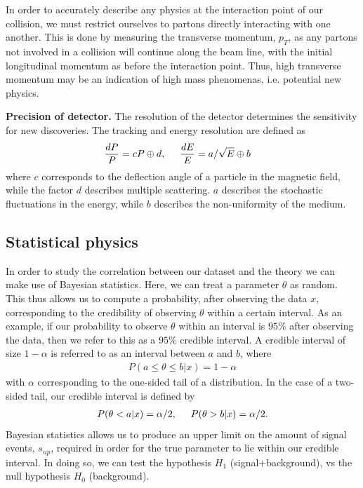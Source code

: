 \documentclass[12pt,a4paper]{amsart}
\begin{document}
In order to accurately describe any physics at the interaction point of our collision, we must restrict ourselves to partons directly interacting with one another. This is done by measuring the transverse momentum, $p_T$, as any partons not involved in a collision will continue along the beam line, with the initial longitudinal momentum as before the interaction point. Thus, high transverse momentum may be an indication of high mass phenomenas, i.e. potential new physics.


\textbf{Precision of detector.} The resolution of the detector determines the sensitivity for new discoveries. The tracking and energy resolution are defined as 
\begin{align}
\frac{dP}{P} = cP\oplus d, \hspace{.5cm}\frac{dE}{E}&= a/\sqrt{E}\oplus b \label{eq:resolution}
\end{align}
where $c$ corresponds to the deflection angle of a particle in the magnetic field, while the factor $d$ describes multiple scattering. $a$ describes the stochastic fluctuations in the energy, while $b$ describes the non-uniformity of the medium.

\subsection{Statistical physics}
In order to study the correlation between our dataset and the theory we can make use of Bayesian statistics. Here, we can treat a parameter $\theta$ as random. This thus allows us to compute a probability, after observing the data $x$, corresponding to the credibility of observing $\theta$ within a certain interval. As an example, if our probability to observe $\theta$ within an interval is $95\%$ after observing the data, then we refer to this as a $95\%$ credible interval. A credible interval of size $1-\alpha$ is referred to as an interval between $a$ and $b$, where
\begin{align}
P(a\leq \theta \leq b|x) = 1-\alpha	\label{eq:credible_interval_one_sided}
\end{align}
with $\alpha$ corresponding to the one-sided tail of a distribution. In the case of a two-sided tail, our credible interval is defined by
\begin{align}
P(\theta<a|x) = \alpha/2, \hspace{.5cm} P(\theta > b|x) = \alpha/2.	\label{eq:credible_interval_two_sided}
\end{align}
Bayesian statistics allows us to produce an upper limit on the amount of signal events, $s_{up}$, required in order for the true parameter to lie within our credible interval. In doing so, we can test the hypothesis $H_1$ (signal+background), vs the null hypothesis $H_0$ (background).
\end{document}
